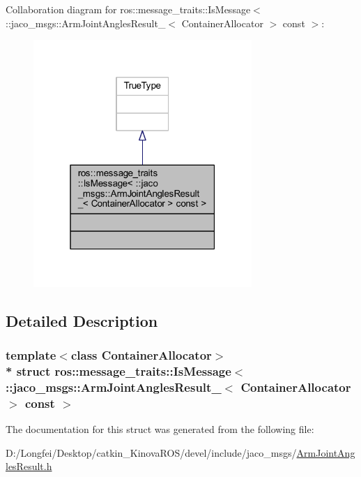 Collaboration diagram for ros\+:\+:message\+\_\+traits\+:\+:Is\+Message$<$ \+:\+:jaco\+\_\+msgs\+:\+:Arm\+Joint\+Angles\+Result\+\_\+$<$ Container\+Allocator $>$ const $>$\+:
\nopagebreak
\begin{figure}[H]
\begin{center}
\leavevmode
\includegraphics[width=235pt]{d7/d00/structros_1_1message__traits_1_1IsMessage_3_01_1_1jaco__msgs_1_1ArmJointAnglesResult___3_01Conta947ab64c4b47c80538d39dc809fd26f8}
\end{center}
\end{figure}


\subsection{Detailed Description}
\subsubsection*{template$<$class Container\+Allocator$>$\\*
struct ros\+::message\+\_\+traits\+::\+Is\+Message$<$ \+::jaco\+\_\+msgs\+::\+Arm\+Joint\+Angles\+Result\+\_\+$<$ Container\+Allocator $>$ const  $>$}



The documentation for this struct was generated from the following file\+:\begin{DoxyCompactItemize}
\item 
D\+:/\+Longfei/\+Desktop/catkin\+\_\+\+Kinova\+R\+O\+S/devel/include/jaco\+\_\+msgs/\hyperlink{ArmJointAnglesResult_8h}{Arm\+Joint\+Angles\+Result.\+h}\end{DoxyCompactItemize}
